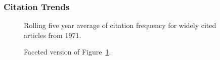 \documentclass[
  10pt,
  letterpaper,
  DIV=11,
  numbers=noendperiod,
  twoside]{scrartcl}
\begin{document}
\subsubsection*{Citation Trends}\label{sec-trends-1971}

\begin{figure}


\caption{\label{fig-citation-spaghetti-1971}Rolling five year average of
citation frequency for widely cited articles from 1971.}

\end{figure}%

\begin{figure}


\caption{\label{fig-citation-facet-1971}Faceted version of
Figure~\ref{fig-citation-spaghetti-1971}.}

\end{figure}%
\end{document}
